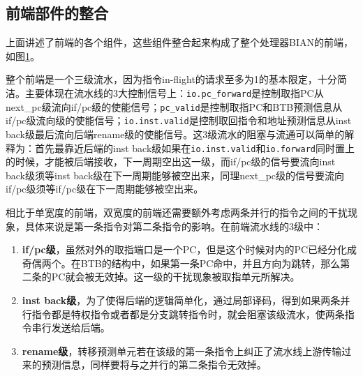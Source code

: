 \subsection{前端部件的整合}
上面讲述了前端的各个组件，这些组件整合起来构成了整个处理器BIAN的前端，如图\ref{fig:frontend}。
\begin{figure}[!htbp]
	\centering
	\label{fig:frontend}
\end{figure}

整个前端是一个三级流水，因为指令in-flight的请求至多为1的基本限定，十分简洁。主要体现在流水线的3大控制信号上：\texttt{io.pc\_forward}是控制取指PC从next\_pc级流向if/pc级的使能信号；\texttt{pc\_valid}是控制取指PC和BTB预测信息从if/pc级流向级的使能信号；\texttt{io.inst.valid}是控制取回指令和地址预测信息从inst back级最后流向后端rename级的使能信号。这3级流水的阻塞与流通可以简单的解释为：首先最靠近后端的inst back级如果在\texttt{io.inst.valid}和\texttt{io.forward}同时置上的时候，才能被后端接收，下一周期空出这一级，而if/pc级的信号要流向inst back级须等inst back级在下一周期能够被空出来，同理next\_pc级的信号要流向if/pc级须等if/pc级在下一周期能够被空出来。

相比于单宽度的前端，双宽度的前端还需要额外考虑两条并行的指令之间的干扰现象，具体来说是第一条指令对第二条指令的影响。在前端流水线的3级中：
\begin{enumerate}
	\item \textbf{if/pc级}，虽然对外的取指端口是一个PC，但是这个时候对内的PC已经分化成奇偶两个。在BTB的结构中，如果第一条PC命中，并且方向为跳转，那么第二条的PC就会被无效掉。这一级的干扰现象被取指单元所解决。
	\item \textbf{inst back级}，为了使得后端的逻辑简单化，通过局部译码，得到如果两条并行指令都是特权指令或者都是分支跳转指令时，就会阻塞该级流水，使两条指令串行发送给后端。
	\item \textbf{rename级}，转移预测单元若在该级的第一条指令上纠正了流水线上游传输过来的预测信息，同样要将与之并行的第二条指令无效掉。
\end{enumerate}

